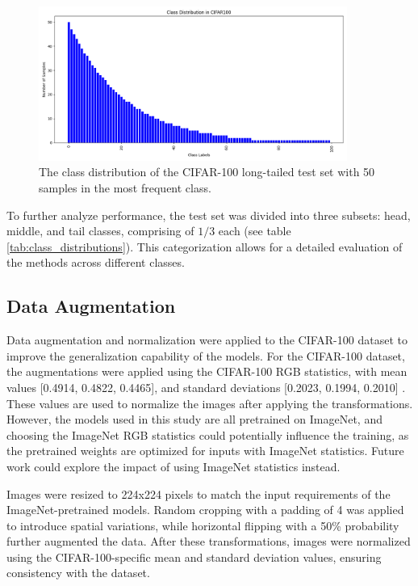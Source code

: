 \begin{figure}[h!]
    \centering
    \includegraphics[width=0.9\textwidth]{Images/Plots/cifar100_test_imb.png}
    \caption{The class distribution of the CIFAR-100 long-tailed test set with 50 samples in the most frequent class.}
    \label{fig:cifar100_test_imb}
\end{figure}

To further analyze performance, the test set was divided into three subsets: head, middle, and tail classes, comprising of $1/3$ each (see table \ref{tab:class_distributions}). This categorization allows for a detailed evaluation of the methods across different classes. 


\subsection{Data Augmentation}
Data augmentation and normalization were applied to the CIFAR-100 dataset to improve the generalization capability of the models. For the CIFAR-100 dataset, the augmentations were applied using the CIFAR-100 RGB statistics, with mean values [0.4914, 0.4822, 0.4465], and standard deviations [0.2023, 0.1994, 0.2010] \cite{cao2019learningimbalanceddatasetslabeldistributionaware}. These values are used to normalize the images after applying the transformations. However, the models used in this study are all pretrained on ImageNet, and choosing the ImageNet RGB statistics could potentially influence the training, as the pretrained weights are optimized for inputs with ImageNet statistics. Future work could explore the impact of using ImageNet statistics instead.

Images were resized to 224x224 pixels to match the input requirements of the ImageNet-pretrained models. Random cropping with a padding of 4 was applied to introduce spatial variations, while horizontal flipping with a 50\% probability further augmented the data. After these transformations, images were normalized using the CIFAR-100-specific mean and standard deviation values, ensuring consistency with the dataset.

